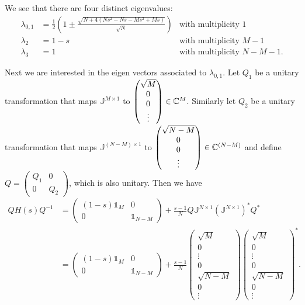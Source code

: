 We see that there are four distinct eigenvalues:
\begin{align*}
\lambda_{0,1} &= \frac{1}{2}\left(1\pm \frac{\sqrt{N+4(Ns^2-Ns-Ms^2+Ms)}}{\sqrt{N}}\right) &\text{with multiplicity $1$}\\
\lambda_{2} &= 1-s &\text{with multiplicity $M-1$}\\
\lambda_{3} &= 1 &\text{with multiplicity $N-M-1$.}
\end{align*}

Next we are interested in the eigen vectors associated to $\lambda_{0,1}$. Let $Q_1$ be a unitary transformation that maps $\mathbb{J}^{M\times 1}$ to $\begin{pmatrix}
\sqrt{M} \\ 0 \\ 0 \\ \vdots
\end{pmatrix} \in \mathbb{C}^M$. Similarly let $Q_2$ be a unitary transformation that maps $\mathbb{J}^{(N-M)\times 1}$ to $\begin{pmatrix}
\sqrt{N-M} \\ 0 \\ 0 \\ \vdots
\end{pmatrix} \in \mathbb{C}^{(N-M)}$ and define $Q = \begin{pmatrix}
Q_1 & 0 \\ 0 & Q_2
\end{pmatrix}$, which is also unitary. Then we have
\begin{align*}
    QH(s)Q^{-1} &= \begin{pmatrix}
        (1-s)\mathbb{1}_M & 0 \\ 0 & \mathbb{1}_{N-M}
        \end{pmatrix} + \frac{s-1}{N}Q\mathbb{J}^{N\times 1}(\mathbb{J}^{N\times 1})^*Q^* \\
    &= \begin{pmatrix}
        (1-s)\mathbb{1}_M & 0 \\ 0 & \mathbb{1}_{N-M}
        \end{pmatrix} + \frac{s-1}{N} \begin{pmatrix}\sqrt{M} \\ 0 \\ \vdots \\ 0 \\ \sqrt{N-M} \\ 0 \\ \vdots \end{pmatrix}\begin{pmatrix}\sqrt{M} \\ 0 \\ \vdots \\ 0 \\ \sqrt{N-M} \\ 0 \\ \vdots \end{pmatrix}^*.
\end{align*}

